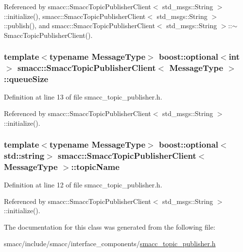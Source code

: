 Referenced by smacc\+::\+Smacc\+Topic\+Publisher\+Client$<$ std\+\_\+msgs\+::\+String $>$\+::initialize(), smacc\+::\+Smacc\+Topic\+Publisher\+Client$<$ std\+\_\+msgs\+::\+String $>$\+::publish(), and smacc\+::\+Smacc\+Topic\+Publisher\+Client$<$ std\+\_\+msgs\+::\+String $>$\+::$\sim$\+Smacc\+Topic\+Publisher\+Client().

\subsubsection[{\texorpdfstring{queue\+Size}{queueSize}}]{\setlength{\rightskip}{0pt plus 5cm}template$<$typename Message\+Type$>$ boost\+::optional$<${\bf int}$>$ {\bf smacc\+::\+Smacc\+Topic\+Publisher\+Client}$<$ Message\+Type $>$\+::queue\+Size}\hypertarget{classsmacc_1_1SmaccTopicPublisherClient_af6094c0d04c48cec8334ced16e36d998}{}\label{classsmacc_1_1SmaccTopicPublisherClient_af6094c0d04c48cec8334ced16e36d998}


Definition at line 13 of file smacc\+\_\+topic\+\_\+publisher.\+h.



Referenced by smacc\+::\+Smacc\+Topic\+Publisher\+Client$<$ std\+\_\+msgs\+::\+String $>$\+::initialize().

\subsubsection[{\texorpdfstring{topic\+Name}{topicName}}]{\setlength{\rightskip}{0pt plus 5cm}template$<$typename Message\+Type$>$ boost\+::optional$<$std\+::string$>$ {\bf smacc\+::\+Smacc\+Topic\+Publisher\+Client}$<$ Message\+Type $>$\+::topic\+Name}\hypertarget{classsmacc_1_1SmaccTopicPublisherClient_ada35d87707eacd2ad863322ddf087b5b}{}\label{classsmacc_1_1SmaccTopicPublisherClient_ada35d87707eacd2ad863322ddf087b5b}


Definition at line 12 of file smacc\+\_\+topic\+\_\+publisher.\+h.



Referenced by smacc\+::\+Smacc\+Topic\+Publisher\+Client$<$ std\+\_\+msgs\+::\+String $>$\+::initialize().



The documentation for this class was generated from the following file\+:\begin{DoxyCompactItemize}
\item 
smacc/include/smacc/interface\+\_\+components/\hyperlink{smacc__topic__publisher_8h}{smacc\+\_\+topic\+\_\+publisher.\+h}\end{DoxyCompactItemize}
